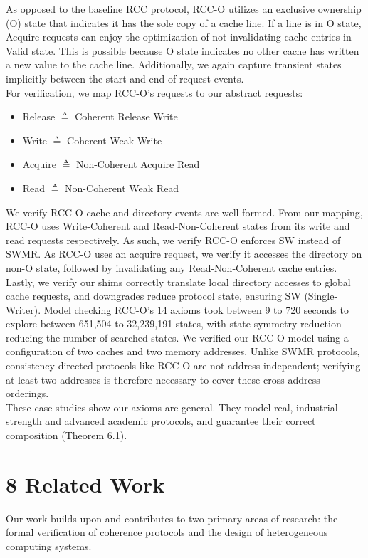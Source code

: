 \documentclass[10pt]{article}
\begin{document}
As opposed to the baseline RCC protocol, RCC-O utilizes an exclusive ownership (O) state that indicates it has the sole copy of a cache line. If a line is in O state, Acquire requests can enjoy the optimization of not invalidating cache entries in Valid state. This is possible because O state indicates no other cache has written a new value to the cache line. Additionally, we again capture transient states implicitly between the start and end of request events.\\
For verification, we map RCC-O's requests to our abstract requests:

\begin{itemize}
  \item[-] Release $\triangleq$ Coherent Release Write
  \item[-] Write $\triangleq$ Coherent Weak Write
  \item[-] Acquire $\triangleq$ Non-Coherent Acquire Read
  \item[-] Read $\triangleq$ Non-Coherent Weak Read
\end{itemize}

We verify RCC-O cache and directory events are well-formed. From our mapping, RCC-O uses Write-Coherent and Read-Non-Coherent states from its write and read requests respectively. As such, we verify RCC-O enforces SW instead of SWMR. As RCC-O uses an acquire request, we verify it accesses the directory on non-O state, followed by invalidating any Read-Non-Coherent cache entries. Lastly, we verify our shims correctly translate local directory accesses to global cache requests, and downgrades reduce protocol state, ensuring SW (Single-Writer). Model checking RCC-O's 14 axioms took between 9 to 720 seconds to explore between 651,504 to 32,239,191 states, with state symmetry reduction reducing the number of searched states. We verified our RCC-O model using a configuration of two caches and two memory addresses. Unlike SWMR protocols, consistency-directed protocols like RCC-O are not address-independent; verifying at least two addresses is therefore necessary to cover these cross-address orderings.\\
These case studies show our axioms are general. They model real, industrial-strength and advanced academic protocols, and guarantee their correct composition (Theorem 6.1).

\section*{8 Related Work}
Our work builds upon and contributes to two primary areas of research: the formal verification of coherence protocols and the design of heterogeneous computing systems.
\end{document}
